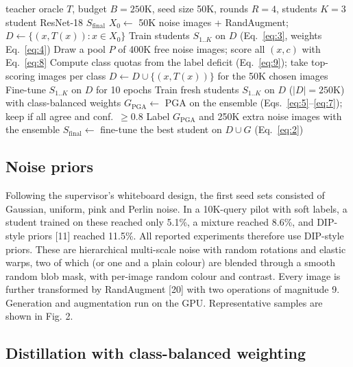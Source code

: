 \documentclass[
  10pt,
]{article}
\begin{document}
\begin{algorithm}[t]
\caption{Student-guided black-box distillation from noise (v2)}
\begin{algorithmic}[1]
\Require teacher oracle $T$, budget $B{=}250$K, seed size 50K, rounds $R{=}4$, students $K{=}3$
\Ensure student ResNet-18 $S_{\text{final}}$
\State $X_0\gets$ 50K noise images + RandAugment;\; $D\gets\{(x,T(x)) : x\in X_0\}$ 
\State Train students $S_{1..K}$ on $D$ (Eq.~\ref{eq:3}, weights Eq.~\ref{eq:4})
  \State Draw a pool $P$ of 400K free noise images; score all $(x,c)$ with Eq.~\ref{eq:8} 
  \State Compute class quotas from the label deficit (Eq.~\ref{eq:9}); take top-scoring images per class
  \State $D\gets D\cup\{(x,T(x))\}$ for the 50K chosen images 
  \State Fine-tune $S_{1..K}$ on $D$ for 10 epochs
\EndFor
\State Train fresh students $S_{1..K}$ on $D$ ($|D|=250$K) with class-balanced weights
\State $G_{\text{PGA}}\gets$ PGA on the ensemble (Eqs.~\ref{eq:5}--\ref{eq:7}); keep if all agree and conf.\ $\ge 0.8$ 
\State Label $G_{\text{PGA}}$ and 250K extra noise images with the ensemble 
\State $S_{\text{final}}\gets$ fine-tune the best student on $D\cup G$ (Eq.~\ref{eq:2})
\end{algorithmic}
\end{algorithm}

\hypertarget{noise-priors}{%
\subsection{Noise priors}\label{noise-priors}}

Following the supervisor's whiteboard design, the first seed sets
consisted of Gaussian, uniform, pink and Perlin noise. In a 10K-query
pilot with soft labels, a student trained on these reached only 5.1\%, a
mixture reached 8.6\%, and DIP-style priors {[}11{]} reached 11.5\%. All
reported experiments therefore use DIP-style priors. These are
hierarchical multi-scale noise with random rotations and elastic warps,
two of which (or one and a plain colour) are blended through a smooth
random blob mask, with per-image random colour and contrast. Every image
is further transformed by RandAugment {[}20{]} with two operations of
magnitude 9. Generation and augmentation run on the GPU. Representative
samples are shown in Fig. 2.

\hypertarget{distillation-with-class-balanced-weighting}{%
\subsection{Distillation with class-balanced
weighting}\label{distillation-with-class-balanced-weighting}}
\end{document}
